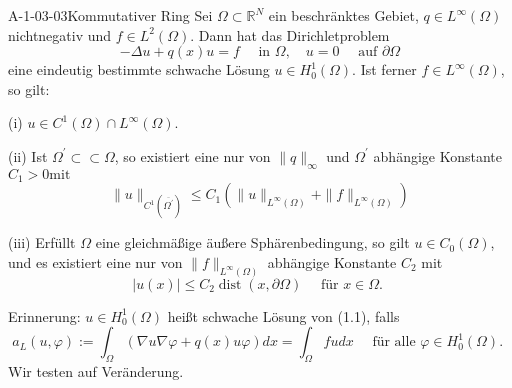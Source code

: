 
\begin{DEF}{A-1-03-03}{Kommutativer Ring}
Sei $\Omega \subset \mathbb{R}^{N}$ ein beschränktes Gebiet, $q \in L^{\infty}(\Omega)$ nichtnegativ und $f \in L^{2}(\Omega)$. Dann hat das Dirichletproblem
$$
-\Delta u+q(x) u=f \quad \text { in } \Omega, \quad u=0 \quad \text { auf } \partial \Omega
$$
eine eindeutig bestimmte schwache Lösung $u \in H_{0}^{1}(\Omega)$. Ist ferner $f \in L^{\infty}(\Omega)$, so gilt:

(i) $u \in C^{1}(\Omega) \cap L^{\infty}(\Omega)$.

(ii) Ist $\Omega^{\prime} \subset \subset \Omega$, so existiert eine nur von $\|q\|_{\infty}$ und $\Omega^{\prime}$ abhängige Konstante $C_{1}>0 \mathrm{mit}$
$$
\|u\|_{C^{1}\left(\overline{\Omega^{\prime}}\right)} \leq C_{1}\left(\|u\|_{L^{\infty}(\Omega)}+\|f\|_{L^{\infty}(\Omega)}\right)
$$

(iii) Erfüllt $\Omega$ eine gleichmäßige äußere Sphärenbedingung, so gilt $u \in C_{0}(\Omega)$, und es existiert eine nur von $\|f\|_{L^{\infty}(\Omega)}$ abhängige Konstante $C_{2}$ mit
$$
|u(x)| \leq C_{2} \operatorname{dist}(x, \partial \Omega) \quad \text { für } x \in \Omega \text {. }
$$

Erinnerung: $u \in H_{0}^{1}(\Omega)$ heißt schwache Lösung von (1.1), falls
$$
a_{L}(u, \varphi):=\int_{\Omega}(\nabla u \nabla \varphi+q(x) u \varphi) d x=\int_{\Omega} f u d x \quad \text { für alle } \varphi \in H_{0}^{1}(\Omega) \text {. }
$$
Wir testen auf Veränderung.
\end{DEF}
